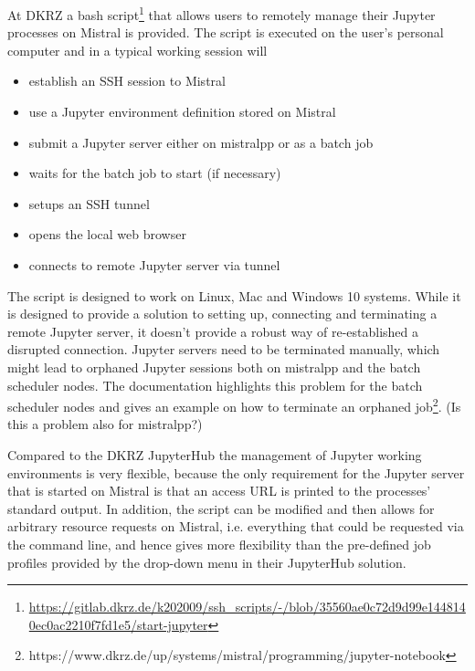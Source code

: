 At DKRZ a bash script\footnote{\url{https://gitlab.dkrz.de/k202009/ssh_scripts/-/blob/35560ae0c72d9d99e1448140ec0ac2210f7fd1e5/start-jupyter}} that allows users to remotely manage their Jupyter processes on Mistral is provided.
The script is executed on the user's personal computer and in a typical working session will
\begin{itemize}
    \item establish an SSH session to Mistral
    \item use a Jupyter environment definition stored on Mistral
    \item submit a Jupyter server either on mistralpp or as a batch job
    \item waits for the batch job to start (if necessary)
    \item setups an SSH tunnel
    \item opens the local web browser
    \item connects to remote Jupyter server via tunnel
\end{itemize}

The script is designed to work on Linux, Mac and Windows 10 systems.
While it is designed to provide a solution to setting up, connecting and terminating a remote Jupyter server, it doesn't provide a robust way of re-established a disrupted connection.
Jupyter servers need to be terminated manually, which might lead to orphaned Jupyter sessions both on mistralpp and the batch scheduler nodes.
The documentation highlights this problem for the batch scheduler nodes and gives an example on how to terminate an orphaned job\footnote{https://www.dkrz.de/up/systems/mistral/programming/jupyter-notebook}.
(Is this a problem also for mistralpp?)

Compared to the DKRZ JupyterHub the management of Jupyter working environments is very flexible, because the only requirement for the Jupyter server that is started on Mistral is that an access URL is printed to the processes' standard output.
In addition, the script can be modified and then allows for arbitrary resource requests on Mistral, i.e. everything that could be requested via the command line, and hence gives more flexibility than the pre-defined job profiles provided by the drop-down menu in their JupyterHub solution.
